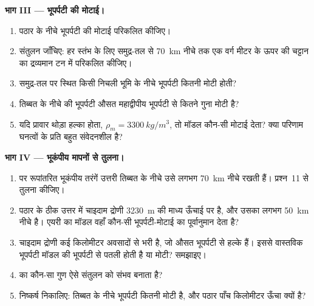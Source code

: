 \begin{problem}[{सप्ताहांत समस्या --- एक पठार को तौलना}]
\medskip
\noindent\textbf{भाग III --- भूपर्पटी की मोटाई।}
\begin{enumerate}[resume]
  \item पठार के नीचे भूपर्पटी की मोटाई परिकलित कीजिए।
  \item संतुलन जाँचिए: हर स्तंभ के लिए समुद्र-तल से \qty{70}{km} नीचे तक
        एक वर्ग मीटर के ऊपर की चट्टान का द्रव्यमान टन में परिकलित कीजिए।
  \item समुद्र-तल पर स्थित किसी निचली भूमि के नीचे भूपर्पटी कितनी मोटी होती?
  \item तिब्बत के नीचे की भूपर्पटी औसत महाद्वीपीय भूपर्पटी से कितने गुना
        मोटी है?
  \item यदि प्रावार थोड़ा हल्का होता, $\rho_m = \qty{3300}{kg/m^3}$,
        तो मॉडल कौन-सी मोटाई देता? क्या परिणाम घनत्वों के प्रति
        बहुत संवेदनशील है?
\end{enumerate}

\medskip
\noindent\textbf{भाग IV --- भूकंपीय मापनों से तुलना।}
\begin{enumerate}[resume]
  \item {} पर रूपांतरित भूकंपीय तरंगें उत्तरी तिब्बत के नीचे उसे लगभग \qty{70}{km}
        नीचे रखती हैं। प्रश्न~11 से तुलना कीजिए।
  \item पठार के ठीक उत्तर में चाइदाम द्रोणी \qty{3230}{m} की माध्य
        ऊँचाई पर है, और उसका  लगभग \qty{50}{km}
        नीचे है। एयरी का मॉडल वहाँ कौन-सी भूपर्पटी-मोटाई का पूर्वानुमान देता है?
  \item चाइदाम द्रोणी कई किलोमीटर अवसादों से भरी है, जो
        औसत भूपर्पटी से हल्के हैं। इससे वास्तविक भूपर्पटी मॉडल की भूपर्पटी से पतली होती है या
        मोटी? समझाइए।
  \item {} का कौन-सा गुण ऐसे संतुलन को संभव बनाता है?
  \item निष्कर्ष निकालिए: तिब्बत के नीचे भूपर्पटी कितनी मोटी है, और
        पठार पाँच किलोमीटर ऊँचा क्यों है?
\end{enumerate}
\end{problem}
